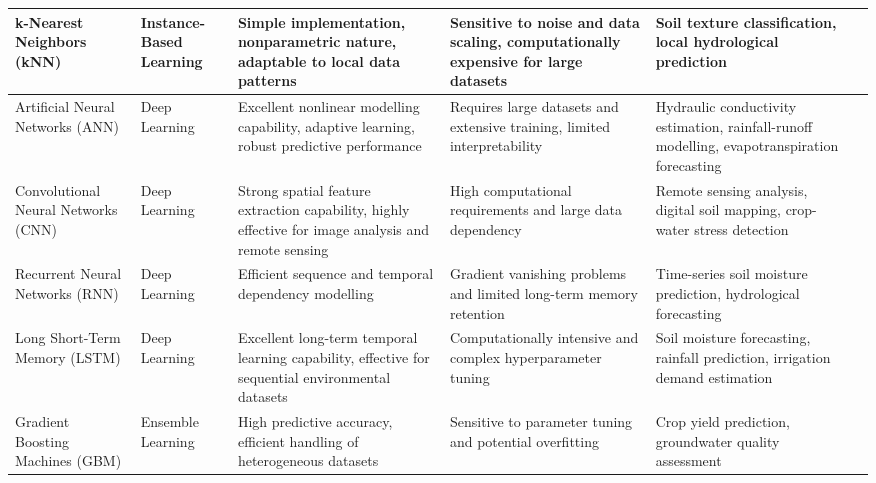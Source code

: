 \documentclass[land,article,submit,pdftex,moreauthors]{Definitions/mdpi}
\numberwithin{equation}{section}
\begin{document}
\begin{longtable}{p{1.4cm} p{1.3cm} p{2.6cm} p{2.6cm} p{2.6cm} p{2.3cm}}
k-Nearest Neighbors (kNN) &
Instance-Based Learning &
Simple implementation, nonparametric nature, adaptable to local data patterns &
Sensitive to noise and data scaling, computationally expensive for large datasets &
Soil texture classification, local hydrological prediction &
\citep{Cover1967, Altman1992, VELOSO2022e00569, Elshorbagy2010, Fix1989} \\ \hline

Artificial Neural Networks (ANN) &
Deep Learning &
Excellent nonlinear modelling capability, adaptive learning, robust predictive performance &
Requires large datasets and extensive training, limited interpretability &
Hydraulic conductivity estimation, rainfall-runoff modelling, evapotranspiration forecasting &
\citep{Hornik1989, Maier2000, Govindaraju2000, ASCE2000, Dawson2001} \\ \hline

Convolutional Neural Networks (CNN) &
Deep Learning &
Strong spatial feature extraction capability, highly effective for image analysis and remote sensing &
High computational requirements and large data dependency &
Remote sensing analysis, digital soil mapping, crop-water stress detection &
\citep{LeCun2015, Padarian2019, ai5020033, Krizhevsky2017, Ng2019} \\ \hline

Recurrent Neural Networks (RNN) &
Deep Learning &
Efficient sequence and temporal dependency modelling &
Gradient vanishing problems and limited long-term memory retention &
Time-series soil moisture prediction, hydrological forecasting &
\citep{Jordan1986, Elman1990, Coulibaly2001, hydrology12080207, Medsker2001} \\ \hline

Long Short-Term Memory (LSTM) &
Deep Learning &
Excellent long-term temporal learning capability, effective for sequential environmental datasets &
Computationally intensive and complex hyperparameter tuning &
Soil moisture forecasting, rainfall prediction, irrigation demand estimation &
\citep{Hochreiter1997, Kratzert2018, Fang2017, Zhang2019_LSTM, Aetal} \\ \hline

Gradient Boosting Machines (GBM) &
Ensemble Learning &
High predictive accuracy, efficient handling of heterogeneous datasets &
Sensitive to parameter tuning and potential overfitting &
Crop yield prediction, groundwater quality assessment &
\citep{Subudhi, Friedman2001, Natekin2013, Elith2008} \\ \hline


\end{longtable}
\end{document}
